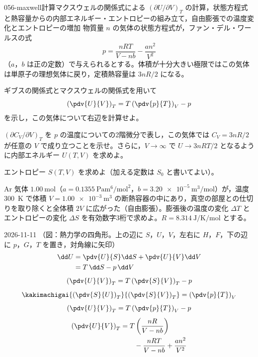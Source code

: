 \documentclass[uplatex,dvipdfmx,a4paper,11pt]{jsarticle}
\begin{document}
\begin{mondai}{056-maxwell}{計算}{マクスウェルの関係式による $(\partial U/\partial V)_{T}$ の計算，状態方程式と熱容量からの内部エネルギー・エントロピーの組み立て，自由膨張での温度変化とエントロピーの増加}
物質量 $n$ の気体の状態方程式が，ファン・デル・ワールスの式
\[ p=\frac{nRT}{V-nb}-\frac{an^{2}}{V^{2}} \]
（$a$，$b$ は正の定数）で与えられるとする。体積が十分大きい極限ではこの気体は単原子の理想気体に戻り，定積熱容量は $3nR/2$ になる。
\begin{shoumon}
  \item ギブスの関係式とマクスウェルの関係式を用いて
  \[ \left(\pdv{U}{V}\right)_{T}=T\left(\pdv{p}{T}\right)_{V}-p \]
  を示し，この気体について右辺を計算せよ。
  \item $(\partial C_{V}/\partial V)_{T}$ を $p$ の温度についての2階微分で表し，この気体では $C_{V}=3nR/2$ が任意の $V$ で成り立つことを示せ。さらに，$V\to\infty$ で $U\to3nRT/2$ となるように内部エネルギー $U(T,V)$ を求めよ。
  \item エントロピー $S(T,V)$ を求めよ（加える定数は $S_{0}$ と書いてよい）。
  \item Ar 気体 $\qty{1.00}{\mole}$（$a=\qty{0.1355}{\pascal\metre\tothe{6}\per\mole\squared}$，$b=\qty{3.20e-5}{\cubic\metre\per\mole}$）が，温度 \qty{300}{\kelvin} で体積 $V=\qty{1.00e-3}{\cubic\metre}$ の断熱容器の中にあり，真空の部屋との仕切りを取り除くと全体積 $2V$ に広がった（自由膨張）。膨張後の温度の変化 $\Delta T$ とエントロピーの変化 $\Delta S$ を有効数字3桁で求めよ。$R=\qty{8.314}{\joule\per\kelvin\per\mole}$ とする。
\end{shoumon}
\begin{kotaeutsushi}{2026-11-11}
（図：熱力学の四角形。上の辺に $S$，$U$，$V$，左右に $H$，$F$，下の辺に $p$，$G$，$T$ を置き，対角線に矢印）
\begin{align*}
\dd U&=\pdv{U}{S}\dd S+\pdv{U}{V}\dd V\\
&=T\,\dd S-p\,\dd V
\end{align*}
\[ \left(\pdv{U}{V}\right)_{T}=T\left(\pdv{S}{V}\right)_{T}-p \]
\[ \kakimachigai{\left(\pdv{S}{U}\right)_{T}}{\left(\pdv{S}{V}\right)_{T}}=\left(\pdv{p}{T}\right)_{V} \]
\[ \left(\pdv{U}{V}\right)_{T}=T\left(\pdv{p}{T}\right)_{V}-p \]
\begin{align*}
\left(\pdv{U}{V}\right)_{T}&=T\left(\frac{nR}{V-nb}\right)\\
&\qquad-\frac{nRT}{V-nb}+\frac{an^{2}}{V^{2}}\\

\end{align*}
\end{kotaeutsushi}
\end{mondai}
\end{document}
